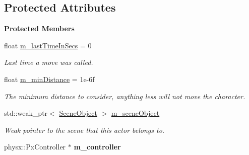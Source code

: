 \subsection*{Protected Attributes}
\begin{Indent}\textbf{ Protected Members}\par
\begin{DoxyCompactItemize}
\item 
\mbox{\label{classrev_1_1_character_controller_ac33e4701fb2ea328f026d110517ea4ce}} 
float \mbox{\hyperlink{classrev_1_1_character_controller_ac33e4701fb2ea328f026d110517ea4ce}{m\+\_\+last\+Time\+In\+Secs}} = 0
\begin{DoxyCompactList}\small\item\em Last time a move was called. \end{DoxyCompactList}\item 
\mbox{\label{classrev_1_1_character_controller_ae3d64e64e21b2617021fa56e8743ea8e}} 
float \mbox{\hyperlink{classrev_1_1_character_controller_ae3d64e64e21b2617021fa56e8743ea8e}{m\+\_\+min\+Distance}} = 1e-\/6f
\begin{DoxyCompactList}\small\item\em The minimum distance to consider, anything less will not move the character. \end{DoxyCompactList}\item 
\mbox{\label{classrev_1_1_character_controller_ab8418cb23af7eb25cac265dfd94e4cbc}} 
std\+::weak\+\_\+ptr$<$ \mbox{\hyperlink{classrev_1_1_scene_object}{Scene\+Object}} $>$ \mbox{\hyperlink{classrev_1_1_character_controller_ab8418cb23af7eb25cac265dfd94e4cbc}{m\+\_\+scene\+Object}}
\begin{DoxyCompactList}\small\item\em Weak pointer to the scene that this actor belongs to. \end{DoxyCompactList}\item 
\mbox{\label{classrev_1_1_character_controller_ac17e4c44dfca188a9569826086e26a65}} 
physx\+::\+Px\+Controller $\ast$ {\bfseries m\+\_\+controller}
\item 
\mbox{\label{classrev_1_1_character_controller_a3cd59b576eb1ff95ddb1e75e95c3e722}} 

\end{DoxyCompactItemize}
\end{Indent}
